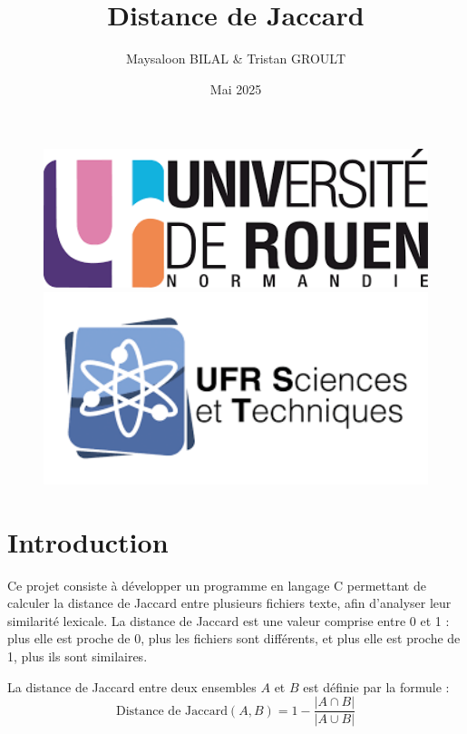 \documentclass{article}
\title{Distance de Jaccard}
\author{Maysaloon BILAL \& Tristan GROULT}
\date{Mai 2025}
\begin{document}
\begin{figure}[t]
    \centering
    \begin{minipage}{0.3\textwidth}
        \centering
        \includegraphics[width=1\textwidth]{logo_univ.png}
    \end{minipage}
    \hfill
    \begin{minipage}{0.3\textwidth}
        \centering
        \includegraphics[width=1\textwidth]{ufr_logo.png}
    \end{minipage}
\end{figure}

\maketitle


\section{Introduction}

Ce projet consiste à développer un programme en langage C permettant de calculer la distance de Jaccard entre plusieurs fichiers texte, afin d’analyser leur similarité lexicale. La distance de Jaccard est une valeur comprise entre 0 et 1 : plus elle est proche de 0, plus les fichiers sont différents, et plus elle est proche de 1, plus ils sont similaires.

La distance de Jaccard entre deux ensembles $A$ et $B$ est définie par la formule :
\[
\text{Distance de Jaccard}(A, B) = 1 - \frac{|A \cap B|}{|A \cup B|}
\]
\end{document}
